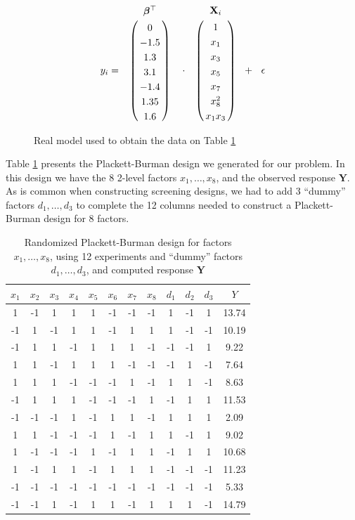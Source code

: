 \documentclass[conference]{IEEEtran}
\begin{document}
\begin{figure}[htpb]
{\normalsize
\begin{align*}
y_i =
\bordermatrix{~ & \bm{\beta}^{\top} \cr & 0 \cr & -1.5 \cr & 1.3 \cr & 3.1 \cr & -1.4 \cr & 1.35 \cr & 1.6} \ \ \ \cdot
\bordermatrix{~ & \mathbf{X}_i \cr & 1 \cr & x_1 \cr & x_3 \cr & x_5
\cr & x_7 \cr & x_8^{2} \cr & x_1x_3} \ \ +
\ \ \epsilon
\end{align*}
}
\caption{Real model used to obtain the data on Table \ref{tab:plackett}}
\label{fig:real_model}
\end{figure}

Table \ref{tab:plackett} presents the Plackett-Burman design we generated for
our problem. In this design we have the 8 2-level factors \(x_1,\dots,x_8\), and
the observed response \(\mathbf{Y}\). As is common when constructing screening
designs, we had to add 3 ``dummy'' factors \(d_1,\dots,d_3\) to complete the 12
columns needed to construct a Plackett-Burman design for 8 factors.

\begin{table}[ht]
\centering
\caption{Randomized Plackett-Burman design for factors $x_1, \dots, x_8$, using 12 experiments and ``dummy'' factors $d_1, \dots, d_3$, and computed response $\mathbf{Y}$}
\label{tab:plackett}
\begingroup\scriptsize
\begin{tabular}{cccccccccccc}
  \toprule
$x_1$ & $x_2$ & $x_3$ & $x_4$ & $x_5$ & $x_6$ & $x_7$ & $x_8$ & $d_1$ & $d_2$ & $d_3$ & $Y$ \\
  \midrule
1 & -1 & 1 & 1 & 1 & -1 & -1 & -1 & 1 & -1 & 1 & 13.74 \\
  -1 & 1 & -1 & 1 & 1 & -1 & 1 & 1 & 1 & -1 & -1 & 10.19 \\
  -1 & 1 & 1 & -1 & 1 & 1 & 1 & -1 & -1 & -1 & 1 & 9.22 \\
  1 & 1 & -1 & 1 & 1 & 1 & -1 & -1 & -1 & 1 & -1 & 7.64 \\
  1 & 1 & 1 & -1 & -1 & -1 & 1 & -1 & 1 & 1 & -1 & 8.63 \\
  -1 & 1 & 1 & 1 & -1 & -1 & -1 & 1 & -1 & 1 & 1 & 11.53 \\
  -1 & -1 & -1 & 1 & -1 & 1 & 1 & -1 & 1 & 1 & 1 & 2.09 \\
  1 & 1 & -1 & -1 & -1 & 1 & -1 & 1 & 1 & -1 & 1 & 9.02 \\
  1 & -1 & -1 & -1 & 1 & -1 & 1 & 1 & -1 & 1 & 1 & 10.68 \\
  1 & -1 & 1 & 1 & -1 & 1 & 1 & 1 & -1 & -1 & -1 & 11.23 \\
  -1 & -1 & -1 & -1 & -1 & -1 & -1 & -1 & -1 & -1 & -1 & 5.33 \\
  -1 & -1 & 1 & -1 & 1 & 1 & -1 & 1 & 1 & 1 & -1 & 14.79 \\
   \bottomrule
\end{tabular}
\endgroup
\end{table}
\end{document}
